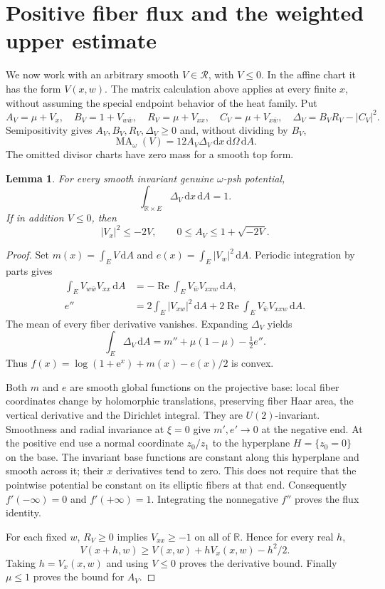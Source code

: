 \documentclass[11pt]{article}
\newtheorem{lemma}[theorem]{Lemma}
\theoremstyle{remark}
\newcommand{\R}{\mathbb R}
\newcommand{\MA}{\operatorname{MA}}
\begin{document}
\section{Positive fiber flux and the weighted upper estimate}
We now work with an arbitrary smooth $V\in\mathcal R$, with $V\leq0$.
In the affine chart it has the form $V(x,w)$. The matrix calculation above
applies at every finite $x$, without assuming the special endpoint behavior
of the heat family. Put
\[
 A_V=\mu+V_x,\quad B_V=1+V_{w\bar w},\quad
 R_V=\mu+V_{xx},\quad C_V=\mu+V_{x\bar w},\quad
 \Delta_V=B_VR_V-|C_V|^2.
\]
Semipositivity gives $A_V,B_V,R_V,\Delta_V\geq0$ and, without dividing
by $B_V$,
\begin{equation}\label{eq:general-density}
 \MA_\omega(V)=12 A_V\Delta_V\,
       \mathrm dx\,\mathrm d\Omega\,\mathrm dA.
\end{equation}
The omitted divisor charts have zero mass for a smooth top form.

\begin{lemma}\label{lem:flux}
For every smooth invariant genuine $\omega$-psh potential,
\[
 \int_{\R\times E}\Delta_V\,\mathrm dx\,\mathrm dA=1.
\]
If in addition $V\leq0$, then
\[
 |V_x|^2\leq-2V,\qquad 0\leq A_V\leq1+\sqrt{-2V}.
\]
\end{lemma}
\begin{proof}
Set $m(x)=\int_EV\,\mathrm dA$ and
$e(x)=\int_E|V_w|^2\,\mathrm dA$.
Periodic integration by parts gives
\[
 \begin{split}
 \int_E V_{w\bar w}V_{xx}\,\mathrm dA
    &=-\operatorname{Re}\int_EV_{\bar w}V_{xxw}\,\mathrm dA,\\
 e''&=2\int_E|V_{xw}|^2\,\mathrm dA
       +2\operatorname{Re}\int_EV_{\bar w}V_{xxw}\,\mathrm dA.
 \end{split}
\]
The mean of every fiber derivative vanishes. Expanding $\Delta_V$ yields
\[
 \int_E\Delta_V\,\mathrm dA
   =m''+\mu(1-\mu)-\tfrac12e''.
\]
Thus $f(x)=\log(1+\mathrm e^x)+m(x)-e(x)/2$ is convex.

Both $m$ and $e$ are smooth global functions on the projective base:
local fiber coordinates change by holomorphic translations, preserving
fiber Haar area, the vertical derivative and the Dirichlet integral.
They are $U(2)$-invariant. Smoothness and radial invariance at $\xi=0$
give $m',e'\to0$ at the negative end. At the positive end use a normal
coordinate $z_0/z_1$ to the hyperplane $H=\{z_0=0\}$ on the base.
The invariant base functions are constant along this hyperplane and
smooth across it; their $x$ derivatives tend to zero. This does not
require that the pointwise potential be constant on its elliptic fibers
at that end. Consequently $f'(-\infty)=0$ and $f'(+\infty)=1$.
Integrating the nonnegative $f''$ proves the flux identity.

For each fixed $w$, $R_V\geq0$ implies $V_{xx}\geq-1$ on all of $\R$.
Hence for every real $h$,
\[
 V(x+h,w)\geq V(x,w)+hV_x(x,w)-h^2/2.
\]
Taking $h=V_x(x,w)$ and using $V\leq0$ proves the derivative bound.
Finally $\mu\leq1$ proves the bound for $A_V$.
\end{proof}
\end{document}
